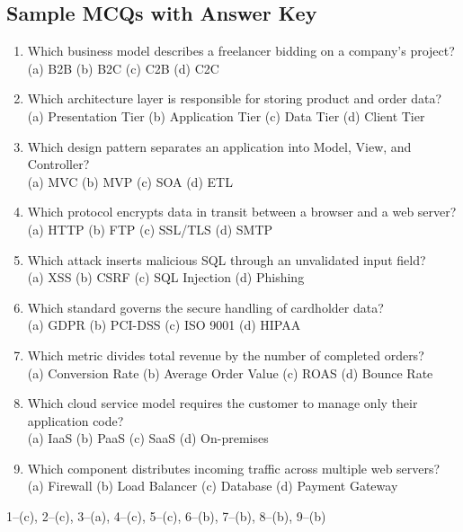 \documentclass[11pt,a4paper]{article}
\begin{document}
\subsection{Sample MCQs with Answer Key}
\begin{enumerate}[leftmargin=*]
  \item Which business model describes a freelancer bidding on a company's project?\\
  (a) B2B \quad (b) B2C \quad (c) C2B \quad (d) C2C
  \item Which architecture layer is responsible for storing product and order data?\\
  (a) Presentation Tier \quad (b) Application Tier \quad (c) Data Tier \quad (d) Client Tier
  \item Which design pattern separates an application into Model, View, and Controller?\\
  (a) MVC \quad (b) MVP \quad (c) SOA \quad (d) ETL
  \item Which protocol encrypts data in transit between a browser and a web server?\\
  (a) HTTP \quad (b) FTP \quad (c) SSL/TLS \quad (d) SMTP
  \item Which attack inserts malicious SQL through an unvalidated input field?\\
  (a) XSS \quad (b) CSRF \quad (c) SQL Injection \quad (d) Phishing
  \item Which standard governs the secure handling of cardholder data?\\
  (a) GDPR \quad (b) PCI-DSS \quad (c) ISO 9001 \quad (d) HIPAA
  \item Which metric divides total revenue by the number of completed orders?\\
  (a) Conversion Rate \quad (b) Average Order Value \quad (c) ROAS \quad (d) Bounce Rate
  \item Which cloud service model requires the customer to manage only their application code?\\
  (a) IaaS \quad (b) PaaS \quad (c) SaaS \quad (d) On-premises
  \item Which component distributes incoming traffic across multiple web servers?\\
  (a) Firewall \quad (b) Load Balancer \quad (c) Database \quad (d) Payment Gateway
\end{enumerate}
\begin{conceptbox}
1--(c), 2--(c), 3--(a), 4--(c), 5--(c), 6--(b), 7--(b), 8--(b), 9--(b)
\end{conceptbox}
\end{document}
